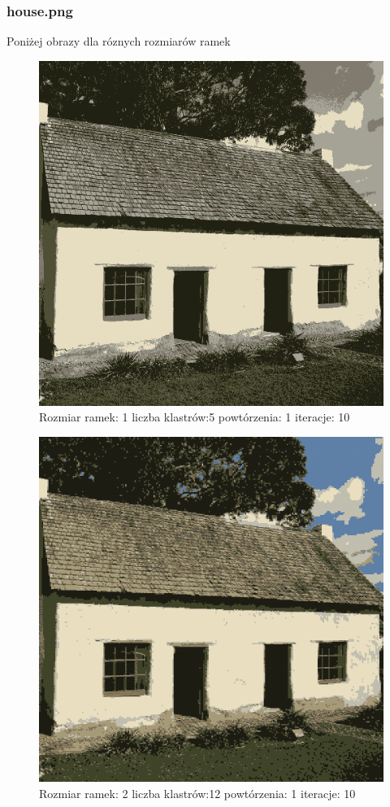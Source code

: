 \documentclass{classrep}
\begin{document}
{{{                \subsubsection{house.png}
                {

                    Poniżej obrazy dla róznych rozmiarów ramek
                    \begin{figure}[!htbp]
                        \centering
                        \includegraphics[width=\textwidth,width=90mm]{obrazy/house_R1_K5_P1_It10.png}
                        \caption{Rozmiar ramek: 1 liczba klastrów:5 powtórzenia: 1 iteracje: 10 }
                    \end{figure}

                    \begin{figure}[!htbp]
                        \centering
                        \includegraphics[width=\textwidth,width=90mm]{obrazy/house_R2_K12_P1_It10.png}
                        \caption{Rozmiar ramek: 2 liczba klastrów:12 powtórzenia: 1 iteracje: 10 }
                    \end{figure}

}}}}
\end{document}
